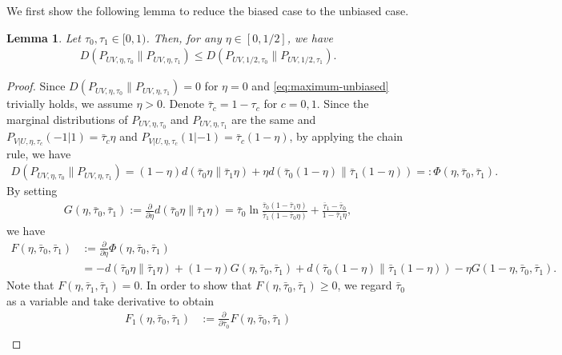 \documentclass[journal,draftcls, onecolumn]{IEEEtran}
\newtheorem{lemma}{Lemma}
\begin{document}
We first show the following lemma to reduce the biased case to the unbiased case.
\begin{lemma} \label{lemma:reduction-to-unbiased}
Let $\tau_0,\tau_1 \in [0,1)$. Then, for any $\eta \in [0,1/2]$, we have
\begin{align} \label{eq:maximum-unbiased}
D(P_{UV,\eta,\tau_0} \| P_{UV,\eta,\tau_1}) \le D(P_{UV,1/2,\tau_0} \| P_{UV,1/2,\tau_1}). 
\end{align}
\end{lemma}
\begin{proof}
Since $D(P_{UV,\eta,\tau_0} \| P_{UV,\eta,\tau_1})=0$ for $\eta=0$ and \eqref{eq:maximum-unbiased} trivially holds, we assume $\eta > 0$.
Denote $\bar{\tau}_c=1-\tau_c$ for $c=0,1$.
Since the marginal distributions of $P_{UV,\eta,\tau_0}$ and $P_{UV,\eta,\tau_1}$ are the same
and $P_{V|U,\eta,\tau_c}(-1|1)=\bar{\tau}_c\eta$ and $P_{V|U,\eta,\tau_c}(1|-1)=\bar{\tau}_c(1-\eta)$, by applying 
the chain rule, we have
\begin{align*}
D(P_{UV,\eta,\tau_0} \| P_{UV,\eta,\tau_1}) = (1-\eta) d(\bar{\tau}_0\eta \| \bar{\tau}_1\eta) + \eta d(\bar{\tau}_0(1-\eta) \| \bar{\tau}_1(1-\eta)) =: \Phi(\eta,\bar{\tau}_0,\bar{\tau}_1).
\end{align*}
By setting
\begin{align*}
G(\eta,\bar{\tau}_0,\bar{\tau}_1) := \frac{\partial}{\partial \eta} d(\bar{\tau}_0\eta\|\bar{\tau}_1\eta) = \bar{\tau}_0 \ln \frac{\bar{\tau}_0(1-\bar{\tau}_1\eta)}{\bar{\tau}_1(1-\bar{\tau}_0\eta)} + \frac{\bar{\tau}_1-\bar{\tau}_0}{1-\bar{\tau}_1\eta},
\end{align*}
we have
\begin{align*}
F(\eta,\bar{\tau}_0,\bar{\tau}_1) &:= \frac{\partial}{\partial \eta} \Phi(\eta,\bar{\tau}_0,\bar{\tau}_1) \\
&= - d(\bar{\tau}_0\eta\| \bar{\tau}_1\eta) + (1-\eta) G(\eta,\bar{\tau}_0,\bar{\tau}_1) + d(\bar{\tau}_0(1-\eta)\|\bar{\tau}_1(1-\eta)) - \eta G(1-\eta,\bar{\tau}_0,\bar{\tau}_1).
\end{align*}
Note that $F(\eta,\bar{\tau}_1,\bar{\tau}_1)=0$. 
In order to show that $F(\eta,\bar{\tau}_0,\bar{\tau}_1) \ge 0$, we regard $\bar{\tau}_0$ as a variable and take derivative to obtain 
\begin{align*}
F_1(\eta,\bar{\tau}_0,\bar{\tau}_1) &:= \frac{\partial}{\partial \bar{\tau}_0} F(\eta,\bar{\tau}_0,\bar{\tau}_1) \\

\end{align*}
\end{proof}
\end{document}

